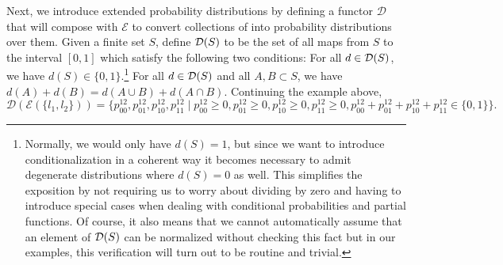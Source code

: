 Next, we introduce extended probability distributions by defining a functor $\mathcal{D}$ that will compose with $\mathcal{E}$ to convert collections of \gnpm{} into probability distributions over them.  Given a finite set $S$, define $\mathcal{D}(S)$ to be the set of all maps from $S$ to the interval $[0,1]$ which satisfy the following two conditions:  For all $d \in \mathcal{D}(S)$, we have $d(S) \in \{0,1\}$.\footnote{Normally, we would only have $d(S) = 1$, but since we want to introduce conditionalization in a coherent way it becomes necessary to admit degenerate distributions where $d(S) = 0$ as well. This simplifies the exposition by not requiring us to worry about dividing by zero and having to introduce special cases when dealing with conditional probabilities and partial functions.  Of course, it also means that we cannot automatically assume that an element of $\mathcal{D}(S)$ can be normalized without checking this fact but in our examples, this verification will turn out to be routine and trivial.}  For all  $d \in \mathcal{D}(S)$ and all $A, B \subset S$, we have $d(A) + d(B) = d(A \cup B) + d(A \cap B)$. Continuing the example above,
$$\mathcal{D}(\mathcal{E}(\{l_1,l_2\})) = \{p^{12}_{00},p^{12}_{01},p^{12}_{10},p^{12}_{11} \mid p^{12}_{00} \geq 0, p^{12}_{01} \geq 0,p^{12}_{10} \geq 0,p^{12}_{11} \geq 0, p^{12}_{00} + p^{12}_{01} + p^{12}_{10} + p^{12}_{11} \in \{ 0, 1 \}  \}.$$

